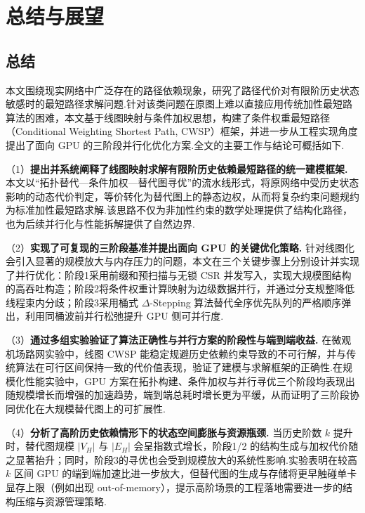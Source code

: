 
\chapter{总结与展望}

\section{总结}

本文围绕现实网络中广泛存在的路径依赖现象，研究了路径代价对有限阶历史状态敏感时的最短路径求解问题.针对该类问题在原图上难以直接应用传统加性最短路算法的困难，本文基于线图映射与条件加权思想，构建了条件权重最短路径（Conditional Weighting Shortest Path, CWSP）框架，并进一步从工程实现角度提出了面向 GPU 的三阶段并行化优化方案.全文的主要工作与结论可概括如下.

（1）\textbf{提出并系统阐释了线图映射求解有限阶历史依赖最短路径的统一建模框架.}
本文以“拓扑替代—条件加权—替代图寻优”的流水线形式，将原网络中受历史状态影响的动态代价判定，等价转化为替代图上的静态边权，从而将复杂约束问题规约为标准加性最短路求解.该思路不仅为非加性约束的数学处理提供了结构化路径，也为后续并行化与性能拆解提供了自然边界.

（2）\textbf{实现了可复现的三阶段基准并提出面向 GPU 的关键优化策略.}
针对线图化会引入显著的规模放大与内存压力的问题，本文在三个关键步骤上分别设计并实现了并行优化：阶段1采用前缀和预扫描与无锁 CSR 并发写入，实现大规模图结构的高吞吐构造；阶段2将条件权重计算映射为边级数据并行，并通过分支规整降低线程束内分歧；阶段3采用桶式 $\Delta$-Stepping 算法替代全序优先队列的严格顺序弹出，利用同桶波前并行松弛提升 GPU 侧可并行度.

（3）\textbf{通过多组实验验证了算法正确性与并行方案的阶段性与端到端收益.}
在微观机场路网实验中，线图 CWSP 能稳定规避历史依赖约束导致的不可行解，并与传统算法在可行区间保持一致的代价值表现，验证了建模与求解框架的正确性.在规模化性能实验中，GPU 方案在拓扑构建、条件加权与并行寻优三个阶段均表现出随规模增长而增强的加速趋势，端到端总耗时增长更为平缓，从而证明了三阶段协同优化在大规模替代图上的可扩展性.

（4）\textbf{分析了高阶历史依赖情形下的状态空间膨胀与资源瓶颈.}
当历史阶数 $k$ 提升时，替代图规模 $|V_H|$ 与 $|E_H|$ 会呈指数式增长，阶段1/2 的结构生成与加权代价随之显著抬升；同时，阶段3的寻优也会受到规模放大的系统性影响.实验表明在较高 $k$ 区间 GPU 的端到端加速比进一步放大，但替代图的生成与存储将更早触碰单卡显存上限（例如出现 out-of-memory），提示高阶场景的工程落地需要进一步的结构压缩与资源管理策略.

